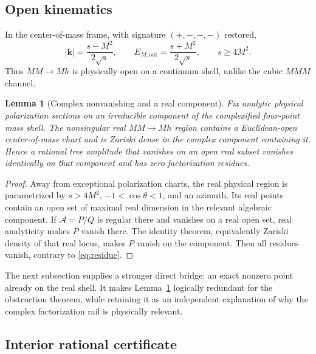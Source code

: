 \documentclass[11pt]{article}
\newtheorem{lemma}[theorem]{Lemma}
\theoremstyle{definition}
\theoremstyle{remark}
\begin{document}
\subsection{Open kinematics}

In the center-of-mass frame, with signature $(+,-,-,-)$ restored,
\begin{equation}\label{eq:comkin}
|\mathbf k|=\frac{s-M^2}{2\sqrt s},
\qquad
E_{M,\mathrm{out}}=\frac{s+M^2}{2\sqrt s},
\qquad s\ge4M^2.
\end{equation}
Thus $MM\to Mh$ is physically open on a continuum shell, unlike the
cubic $MMM$ channel.

\begin{lemma}[Complex nonvanishing and a real component]
\label{lem:zariski}
Fix analytic physical polarization sections on an irreducible component
of the complexified four-point mass shell.  The nonsingular real
$MM\to Mh$ region contains a Euclidean-open center-of-mass chart and is
Zariski dense in the complex component containing it.  Hence a rational
tree amplitude that vanishes on an open real subset vanishes identically
on that component and has zero factorization residues.
\end{lemma}

\begin{proof}
Away from exceptional polarization charts, the real physical region is
parametrized by $s>4M^2$, $-1<\cos\theta<1$, and an azimuth.  Its real
points contain an open set of maximal real dimension in the relevant
algebraic component.  If $\mathcal A=P/Q$ is regular there and vanishes
on a real open set, real analyticity makes $P$ vanish there.  The
identity theorem, equivalently Zariski density of that real locus, makes
$P$ vanish on the component.  Then all residues vanish, contrary to
\eqref{eq:residue}.
\end{proof}

The next subsection supplies a stronger direct bridge: an exact nonzero
point already on the real shell.  It makes Lemma~\ref{lem:zariski}
logically redundant for the obstruction theorem, while retaining it as
an independent explanation of why the complex factorization rail is
physically relevant.

\subsection{Interior rational certificate}
\end{document}
